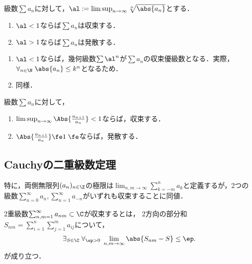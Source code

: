 \documentclass[uplatex, dvipdfmx]{jsreport}
\begin{document}
\begin{theorem}\label{thm-root-test}
    級数$\sum a_n$に対して，$\al:=\limsup_{n\to\infty}\sqrt[n]{\abs{a_n}}$とする．
    \begin{enumerate}
        \item $\al<1$ならば$\sum a_n$は収束する．
        \item $\al>1$ならば$\sum a_n$は発散する．
    \end{enumerate}
\end{theorem}
\begin{Proof}\mbox{}
    \begin{enumerate}
        \item $\al<1$ならば，幾何級数$\sum\al^n$が$\sum a_n$の収束優級数となる．実際，$\forall_{n\in\N}\;\abs{a_n}\le k^n$となるため．
        \item 同様．
    \end{enumerate}
\end{Proof}

\begin{theorem}
    級数$\sum a_n$に対して，
    \begin{enumerate}
        \item $\limsup_{n\to\infty}\Abs{\frac{a_{n+1}}{a_n}}<1$ならば，収束する．
        \item $\Abs{\frac{a_{n+1}}{a_n}}\fe1\;\fe$ならば，発散する．
    \end{enumerate}
\end{theorem}

\subsection{Cauchyの二重級数定理}

\begin{tcolorbox}[colframe=ForestGreen, colback=ForestGreen!10!white,breakable,colbacktitle=ForestGreen!40!white,coltitle=black,fonttitle=\bfseries\sffamily,
title=]
    特に，両側無限列$(a_n)_{n\in\Z}$の極限は$\lim_{n,m\to\infty}\sum_{k=-m}^na_k$と定義するが，2つの級数$\sum_{n=0}^\infty a_n,\sum_{n=1}^\infty a_{-n}$がいずれも収束することに同値．
\end{tcolorbox}

\begin{definition}
    2重級数$\sum_{n,m=1}^\infty a_{nm}\subset\C$が収束するとは，
    2方向の部分和$S_{nm}=\sum_{i=1}^n\sum_{j=1}^ma_{ij}$について，
    \[\exists_{S\in\C}\;\forall_{\ep>0}\;\lim_{n,m\to\infty}\abs{S_{nm}-S}\le\ep.\]
    が成り立つ．
\end{definition}
\end{document}
